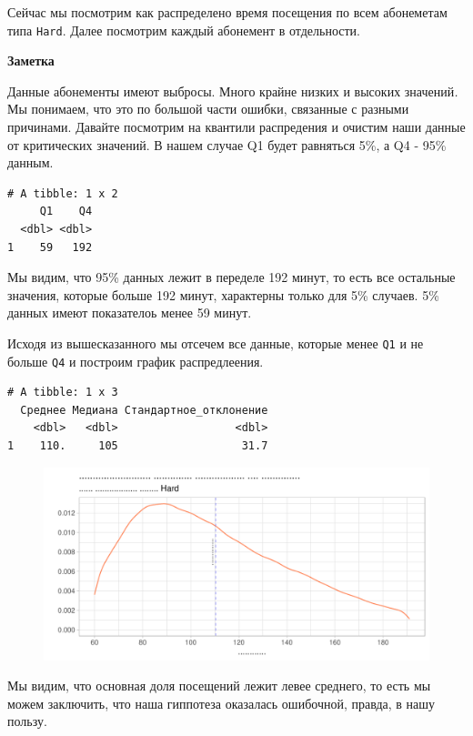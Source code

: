 \documentclass[
  letterpaper,
  DIV=11,
  numbers=noendperiod]{scrartcl}
\begin{document}
Сейчас мы посмотрим как распределено время посещения по всем абонеметам
типа \texttt{Hard}. Далее посмотрим каждый абонемент в отдельности.

\begin{tcolorbox}[enhanced jigsaw, left=2mm, bottomrule=.15mm, opacityback=0, arc=.35mm, colframe=quarto-callout-note-color-frame, rightrule=.15mm, colback=white, toprule=.15mm, breakable, leftrule=.75mm]
\begin{minipage}[t]{5.5mm}
\textcolor{quarto-callout-note-color}{\faInfo}
\end{minipage}%
\begin{minipage}[t]{\textwidth - 5.5mm}

\textbf{Заметка}\vspace{2mm}

Данные абонементы имеют выбросы. Много крайне низких и высоких
значений\emph{.} Мы понимаем, что это по большой части ошибки, связанные
с разными причинами. Давайте посмотрим на квантили распредения и очистим
наши данные от критических значений. В нашем случае Q1 будет равняться
5\%, а Q4 - 95\% данным.

\end{minipage}%
\end{tcolorbox}

\begin{verbatim}
# A tibble: 1 x 2
     Q1    Q4
  <dbl> <dbl>
1    59   192
\end{verbatim}

Мы видим, что 95\% данных лежит в переделе 192 минут, то есть все
остальные значения, которые больше 192 минут, характерны только для 5\%
случаев. 5\% данных имеют показателоь менее 59 минут.

Исходя из вышесказанного мы отсечем все данные, которые менее
\texttt{Q1} и не больше \texttt{Q4} и построим график распредлеения.

\begin{verbatim}
# A tibble: 1 x 3
  Среднее Медиана Стандартное_отклонение
    <dbl>   <dbl>                  <dbl>
1    110.     105                   31.7
\end{verbatim}

\begin{figure}

{\centering \includegraphics{./intro_files/figure-pdf/unnamed-chunk-32-1.pdf}

}

\end{figure}

Мы видим, что основная доля посещений лежит левее среднего, то есть мы
можем заключить, что наша гиппотеза оказалась ошибочной, правда, в нашу
пользу.
\end{document}

